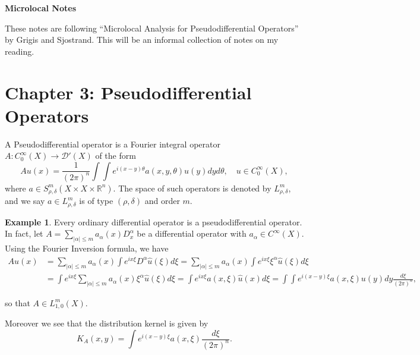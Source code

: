 \documentclass[11pt, reqno]{article}
\theoremstyle{plain}
\theoremstyle{definition}
\newtheorem{example}{Example}
\theoremstyle{remark}
\newcommand{\RR}{\mathbb{R}}
\begin{document}
\topmargin=-40pt
\renewcommand{\headrulewidth}{1pt}
\renewcommand{\headsep}{20pt}
\thispagestyle{fancy}

{\Huge \bfseries \noindent Microlocal Notes}

These notes are following ``Microlocal Analysis for Pseudodifferential Operators'' by Grigis and 
Sjostrand. This will be an informal collection of notes on my reading.

\section*{Chapter 3: Pseudodifferential Operators}

A Pseudodifferential operator is a Fourier integral operator $A: C_0^\infty(X) \to \mathcal{D}'(X)$
of the form
\begin{equation}\label{def1}
    Au(x) = \frac{1}{(2\pi)^n}\int \int e^{i(x-y)\theta}a(x,y,\theta)u(y)dyd\theta,
    \quad u \in C_0^\infty(X),
\end{equation}
where $a \in S_{\rho, \delta}^m(X\times X\times \RR^n).$ The space of such operators is 
denoted by $L_{\rho,\delta}^m$, and we say $a \in L_{\rho,\delta}^m$ is of type $(\rho,\delta)$
and order $m$. 

\begin{example}
    Every ordinary differential operator is a pseudodifferential operator. In fact, 
    let $A = \sum_{|\alpha|\leq m}a_{\alpha}(x) D_x^\alpha$ be a differential operator with 
    $a_\alpha \in C^\infty(X)$. Using the Fourier Inversion formula, we have
    \begin{align*}
        Au(x) & = \sum_{|\alpha| \leq m} a_\alpha(x) \int e^{ix \xi} D^\alpha \hat{u}(\xi)d\xi
        = \sum_{|\alpha| \leq m} a_\alpha(x) \int e^{ix\xi}\xi^\alpha \hat{u}(\xi)d\xi\\ 
        & = \int e^{ix\xi}\sum_{|\alpha| \leq m}a_\alpha(x)\xi^\alpha \hat{u}(\xi)d\xi
        = \int e^{ix\xi}a(x,\xi)\hat{u}(x)d\xi = \int\int e^{i(x-y)\xi} a(x,\xi) u(y)dy \frac{d\xi}{(2\pi)^n},
    \end{align*}

    so that $A \in L_{1,0}^m(X)$.

    Moreover we see that the distribution kernel is given by 
    \[
        K_A(x,y) = \int e^{i(x-y)\xi} a(x,\xi)\frac{d\xi}{(2\pi)^n}.
    \]
\end{example}
\end{document}
